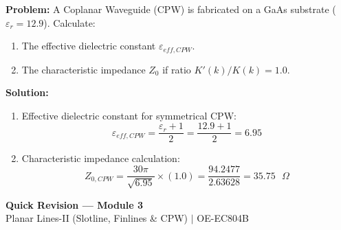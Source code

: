 \documentclass[10pt,a4paper]{article}
\begin{document}
\begin{tcolorbox}[examplebox, title={Worked Numerical: Coplanar Waveguide Impedance Calculation}]
  \textbf{Problem:} A Coplanar Waveguide (CPW) is fabricated on a GaAs substrate ($\varepsilon_r = 12.9$). Calculate:
  \begin{enumerate}[label=(\alph*), noitemsep]
    \item The effective dielectric constant $\varepsilon_{eff,CPW}$.
    \item The characteristic impedance $Z_0$ if ratio $K'(k)/K(k) = 1.0$.
  \end{enumerate}
  \tcblower
  \textbf{Solution:}
  \begin{enumerate}[label=(\alph*), itemsep=4pt]
    \item Effective dielectric constant for symmetrical CPW:
      \begin{equation}
        \varepsilon_{eff,CPW} = \frac{\varepsilon_r + 1}{2} = \frac{12.9 + 1}{2} = 6.95
      \end{equation}
    \item Characteristic impedance calculation:
      \begin{equation}
        Z_{0,CPW} = \frac{30\pi}{\sqrt{6.95}} \times (1.0) = \frac{94.2477}{2.63628} = 35.75\text{ }\Omega
      \end{equation}
  \end{enumerate}
\end{tcolorbox}

\newpage
\begin{center}
  {\large\bfseries\color{myred} Quick Revision --- Module 3}\\[3pt]
  {\small\color{mydark} Planar Lines-II (Slotline, Finlines \& CPW) $|$ OE-EC804B}
\end{center}
\noindent{\color{myred}\rule{\linewidth}{1.2pt}}
\vspace{4pt}
\end{document}
